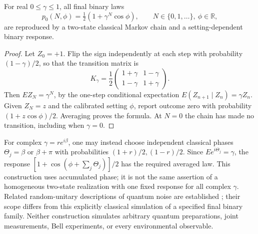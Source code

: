 \begin{proposition}
\label{op:visibility-alias}
For real \(0\le\gamma\le1\), all final binary laws
\[
 p_0(N,\phi)=\tfrac12(1+\gamma^N\cos\phi),
 \qquad N\in\{0,1,\ldots\},\ \phi\in\mathbb R,
\]
are reproduced by a two-state classical Markov chain and a
setting-dependent binary response.
\end{proposition}
\begin{proof}
Let \(Z_0=+1\).  Flip the sign independently at each step with
probability \((1-\gamma)/2\), so that the transition matrix is
\[
 K_\gamma=\frac12
 \begin{pmatrix}1+\gamma&1-\gamma\\1-\gamma&1+\gamma\end{pmatrix}.
\]
Then \(E Z_N=\gamma^N\), by the one-step conditional expectation
\(E(Z_{n+1}\mid Z_n)=\gamma Z_n\).
Given \(Z_N=z\) and the calibrated setting \(\phi\), report outcome zero
with probability \((1+z\cos\phi)/2\).  Averaging proves the formula.
At \(N=0\) the chain has made no transition, including when \(\gamma=0\).
\end{proof}

For complex \(\gamma=re^{i\beta}\), one may instead choose independent
classical phases \(\Theta_j=\beta\) or \(\beta+\pi\) with probabilities
\((1+r)/2,(1-r)/2\).  Since \(E e^{i\Theta_j}=\gamma\), the response
\([1+\cos(\phi+\sum_j\Theta_j)]/2\) has the required averaged law.
This construction uses accumulated phase; it is not the same assertion
of a homogeneous two-state realization with one fixed response for all
complex \(\gamma\).
Related random-unitary descriptions of quantum noise are established
\cite{op:crow}; their scope differs from this explicitly classical
simulation of a specified final binary family.  Neither construction
simulates arbitrary quantum preparations, joint measurements, Bell
experiments, or every environmental observable.

